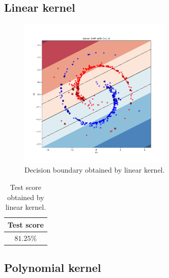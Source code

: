 \documentclass{article}
\begin{document}
\subsection{Linear kernel}

\begin{figure}[!ht]
\centering
\includegraphics[width=0.65\textwidth]{./Figures/2a_bound_lin}
\caption{Decision boundary obtained by linear kernel.}
\label{2_bound_lin}
\end{figure}

\begin{table}[!ht]
\centering
\begin{tabular}{|c|} \hline
Test score \\ \hline
$81.25\%$\\ \hline
\end{tabular}
\caption{Test score obtained by linear kernel.}
\label{2_score_lin}
\end{table}

\subsection{Polynomial kernel}
\end{document}
